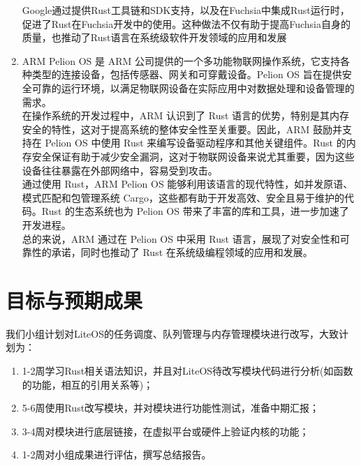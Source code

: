 \documentclass{ctexart}
\begin{document}
\begin{enumerate}
Google通过提供Rust工具链和SDK支持，以及在Fuchsia中集成Rust运行时，促进了Rust在Fuchsia开发中的使用。这种做法不仅有助于提高Fuchsia自身的质量，也推动了Rust语言在系统级软件开发领域的应用和发展
\item ARM Pelion OS 是 ARM 公司提供的一个多功能物联网操作系统，它支持各种类型的连接设备，包括传感器、网关和可穿戴设备。Pelion OS 旨在提供安全可靠的运行环境，以满足物联网设备在实际应用中对数据处理和设备管理的需求。\\
在操作系统的开发过程中，ARM 认识到了 Rust 语言的优势，特别是其内存安全的特性，这对于提高系统的整体安全性至关重要。因此，ARM 鼓励并支持在 Pelion OS 中使用 Rust 来编写设备驱动程序和其他关键组件。Rust 的内存安全保证有助于减少安全漏洞，这对于物联网设备来说尤其重要，因为这些设备往往暴露在外部网络中，容易受到攻击。\\
通过使用 Rust，ARM Pelion OS 能够利用该语言的现代特性，如并发原语、模式匹配和包管理系统 Cargo，这些都有助于开发高效、安全且易于维护的代码。Rust 的生态系统也为 Pelion OS 带来了丰富的库和工具，进一步加速了开发进程。\\
总的来说，ARM 通过在 Pelion OS 中采用 Rust 语言，展现了对安全性和可靠性的承诺，同时也推动了 Rust 在系统级编程领域的应用和发展。
\end{enumerate}
\section{目标与预期成果}
我们小组计划对LiteOS的任务调度、队列管理与内存管理模块进行改写，大致计划为：
\begin{enumerate}
\item 1-2周学习Rust相关语法知识，并且对LiteOS待改写模块代码进行分析(如函数的功能，相互的引用关系等)；
\item 5-6周使用Rust改写模块，并对模块进行功能性测试，准备中期汇报；
\item 3-4周对模块进行底层链接，在虚拟平台或硬件上验证内核的功能；
\item 1-2周对小组成果进行评估，撰写总结报告。
\end{enumerate}
\end{document}
